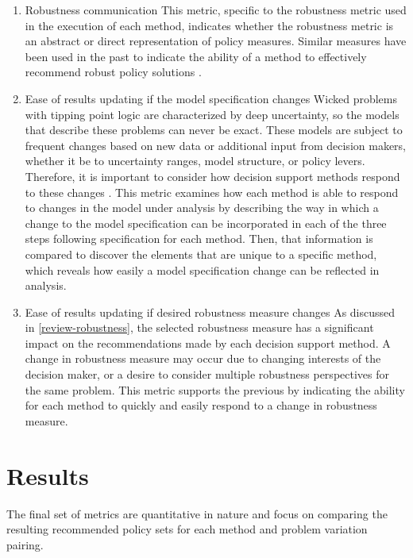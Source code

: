 \begin{enumerate}[leftmargin=*,align=left,label=\textbf{Comparison \arabic* :}]
\begin{enumerate}[resume,leftmargin=*,align=left,label=\textbf{Comparison \arabic* :}]
    \item Robustness communication \newline
          This metric, specific to the robustness metric used in the execution of each method, indicates whether the robustness metric is an abstract or direct representation of policy measures. Similar measures have been used in the past to indicate the ability of a method to effectively recommend robust policy solutions \citep{Gersonius2016, Roach2015}.

    \item Ease of results updating if the model specification changes \newline
          Wicked problems with tipping point logic are characterized by deep uncertainty, so the models that describe these problems can never be exact. These models are subject to frequent changes based on new data or additional input from decision makers, whether it be to uncertainty ranges, model structure, or policy levers. Therefore, it is important to consider how decision support methods respond to these changes \citep{Gersonius2016}. This metric examines how each method is able to respond to changes in the model under analysis by describing the way in which a change to the model specification can be incorporated in each of the three steps following specification for each method. Then, that information is compared to discover the elements that are unique to a specific method, which reveals how easily a model specification change can be reflected in analysis.

    \item Ease of results updating if desired robustness measure changes \newline
          As discussed in \cref{review-robustness}, the selected robustness measure has a significant impact on the recommendations made by each decision support method. A change in robustness measure may occur due to changing interests of the decision maker, or a desire to consider multiple robustness perspectives for the same problem. This metric supports the previous by indicating the ability for each method to quickly and easily respond to a change in robustness measure. 
\end{enumerate}

\section{Results}\label{compare-results}
The final set of metrics are quantitative in nature and focus on comparing the resulting recommended policy sets for each method and problem variation pairing. 


\end{enumerate}

